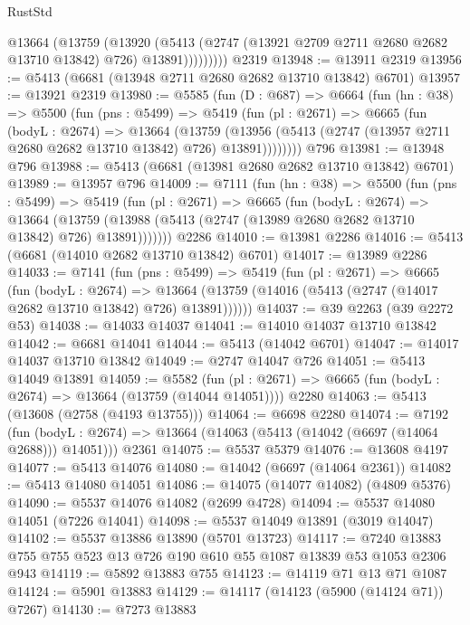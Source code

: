 \begin{lexlean}{RustStd}
\begin{coremodule}
              @13664
                (@13759
                  (@13920
                    (@5413
                      (@2747 (@13921 @2709 @2711 @2680 @2682 @13710 @13842) @726)
                      @13891)))))))))
    @2319
@13948 := @13911 @2319
@13956 := @5413 (@6681 (@13948 @2711 @2680 @2682 @13710 @13842) @6701)
@13957 := @13921 @2319
@13980 := @5585
    (fun (D : @687) =>
    @6664
      (fun (hn : @38) =>
      @5500
        (fun (pns : @5499) =>
        @5419
          (fun (pl : @2671) =>
          @6665
            (fun (bodyL : @2674) =>
            @13664
              (@13759
                (@13956 (@5413 (@2747 (@13957 @2711 @2680 @2682 @13710 @13842) @726) @13891))))))))
    @796
@13981 := @13948 @796
@13988 := @5413 (@6681 (@13981 @2680 @2682 @13710 @13842) @6701)
@13989 := @13957 @796
@14009 := @7111
    (fun (hn : @38) =>
    @5500
      (fun (pns : @5499) =>
      @5419
        (fun (pl : @2671) =>
        @6665
          (fun (bodyL : @2674) =>
          @13664
            (@13759 (@13988 (@5413 (@2747 (@13989 @2680 @2682 @13710 @13842) @726) @13891)))))))
    @2286
@14010 := @13981 @2286
@14016 := @5413 (@6681 (@14010 @2682 @13710 @13842) @6701)
@14017 := @13989 @2286
@14033 := @7141
    (fun (pns : @5499) =>
    @5419
      (fun (pl : @2671) =>
      @6665
        (fun (bodyL : @2674) =>
        @13664 (@13759 (@14016 (@5413 (@2747 (@14017 @2682 @13710 @13842) @726) @13891))))))
@14037 := @39 @2263 (@39 @2272 @53)
@14038 := @14033 @14037
@14041 := @14010 @14037 @13710 @13842
@14042 := @6681 @14041
@14044 := @5413 (@14042 @6701)
@14047 := @14017 @14037 @13710 @13842
@14049 := @2747 @14047 @726
@14051 := @5413 @14049 @13891
@14059 := @5582
    (fun (pl : @2671) => @6665 (fun (bodyL : @2674) => @13664 (@13759 (@14044 @14051))))
    @2280
@14063 := @5413 (@13608 (@2758 (@4193 @13755)))
@14064 := @6698 @2280
@14074 := @7192
    (fun (bodyL : @2674) => @13664 (@14063 (@5413 (@14042 (@6697 (@14064 @2688))) @14051)))
    @2361
@14075 := @5537 @5379
@14076 := @13608 @4197
@14077 := @5413 @14076
@14080 := @14042 (@6697 (@14064 @2361))
@14082 := @5413 @14080 @14051
@14086 := @14075 (@14077 @14082) (@4809 @5376)
@14090 := @5537 @14076 @14082 (@2699 @4728)
@14094 := @5537 @14080 @14051 (@7226 @14041)
@14098 := @5537 @14049 @13891 (@3019 @14047)
@14102 := @5537 @13886 @13890 (@5701 @13723)
@14117 := @7240 @13883 @755 @755 @523 @13 @726 @190 @610 @55 @1087 @13839 @53 @1053 @2306 @943
@14119 := @5892 @13883 @755
@14123 := @14119 @71 @13 @71 @1087
@14124 := @5901 @13883
@14129 := @14117 (@14123 (@5900 (@14124 @71)) @7267)
@14130 := @7273 @13883

\end{coremodule}
\end{lexlean}

